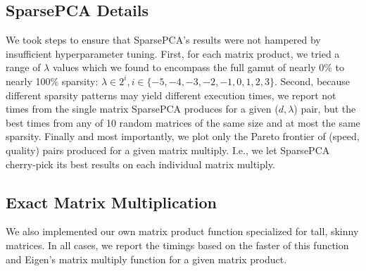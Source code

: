 \begin{itemize}
\end{itemize}



\subsection{SparsePCA Details}

We took steps to ensure that SparsePCA's results were not hampered by insufficient hyperparameter tuning. First, for each matrix product, we tried a range of $\lambda$ values which we found to encompass the full gamut of nearly 0\% to nearly 100\% sparsity: $\lambda \in 2^i, i \in \{-5, -4, -3, -2, -1, 0, 1, 2, 3\}$. Second, because different sparsity patterns may yield different execution times, we report not times from the single matrix SparsePCA produces for a given ($d, \lambda$) pair, but the best times from any of 10 random matrices of the same size and at most the same sparsity. Finally and most importantly, we plot only the Pareto frontier of (speed, quality) pairs produced for a given matrix multiply. I.e., we let SparsePCA cherry-pick its best results on each individual matrix multiply.

\subsection{Exact Matrix Multiplication}

We also implemented our own matrix product function specialized for tall, skinny matrices. In all cases, we report the timings based on the faster of this function and Eigen's \cite{eigen} matrix multiply function for a given matrix product.


